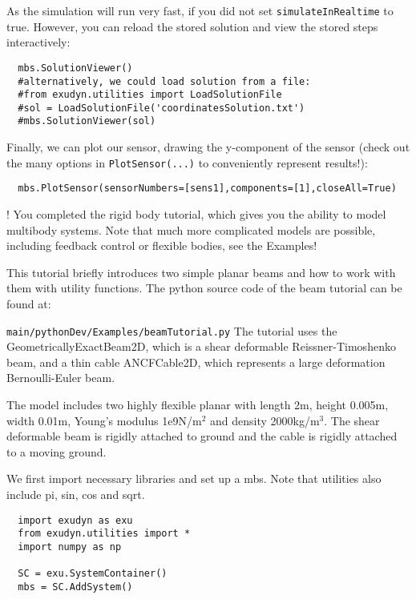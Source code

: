 \noindent As the simulation will run very fast, if you did not set \texttt{simulateInRealtime} to true. However, you can reload the stored solution and view the stored steps interactively:
\pythonstyle\begin{lstlisting}
  mbs.SolutionViewer()
  #alternatively, we could load solution from a file:
  #from exudyn.utilities import LoadSolutionFile
  #sol = LoadSolutionFile('coordinatesSolution.txt')
  #mbs.SolutionViewer(sol)
\end{lstlisting}

\noindent Finally, we can plot our sensor, drawing the y-component of the sensor (check out the many options in \texttt{PlotSensor(...)} to conveniently represent results!):
\pythonstyle\begin{lstlisting}
  mbs.PlotSensor(sensorNumbers=[sens1],components=[1],closeAll=True)
\end{lstlisting}

\noindent {}! You completed the rigid body tutorial, which gives you the ability to model multibody systems. Note that much more complicated models are possible, including feedback control or flexible bodies, see the Examples!


This tutorial briefly introduces two simple planar beams and how to work with them with utility functions.
The python source code of the beam tutorial can be found at:
\bi
  \item[] \texttt{main/pythonDev/Examples/beamTutorial.py}
\ei
The tutorial uses the GeometricallyExactBeam2D, which is a shear deformable Reissner-Timoshenko beam, and a thin cable ANCFCable2D, which represents a large deformation Bernoulli-Euler beam.

\noindent The model includes two highly flexible planar with length 2m, height 0.005m, width 0.01m, 
Young's modulus 1e9N/m$^2$ and density 2000kg/m$^3$.
The shear deformable beam is rigidly attached to ground and the cable is rigidly attached to a moving ground.

\noindent We first import necessary libraries and set up a mbs. Note that utilities also include pi, sin, cos and sqrt.
\pythonstyle\begin{lstlisting}
  import exudyn as exu
  from exudyn.utilities import *
  import numpy as np

  SC = exu.SystemContainer()
  mbs = SC.AddSystem()
\end{lstlisting}

